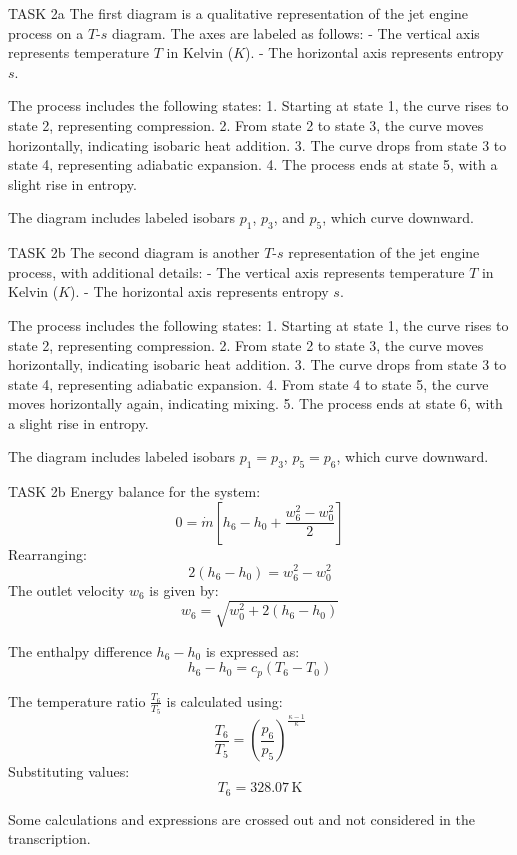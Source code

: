 TASK 2a  
The first diagram is a qualitative representation of the jet engine process on a \( T \)-\( s \) diagram. The axes are labeled as follows:  
- The vertical axis represents temperature \( T \) in Kelvin (\( K \)).  
- The horizontal axis represents entropy \( s \).  

The process includes the following states:  
1. Starting at state 1, the curve rises to state 2, representing compression.  
2. From state 2 to state 3, the curve moves horizontally, indicating isobaric heat addition.  
3. The curve drops from state 3 to state 4, representing adiabatic expansion.  
4. The process ends at state 5, with a slight rise in entropy.  

The diagram includes labeled isobars \( p_1 \), \( p_3 \), and \( p_5 \), which curve downward.  

TASK 2b  
The second diagram is another \( T \)-\( s \) representation of the jet engine process, with additional details:  
- The vertical axis represents temperature \( T \) in Kelvin (\( K \)).  
- The horizontal axis represents entropy \( s \).  

The process includes the following states:  
1. Starting at state 1, the curve rises to state 2, representing compression.  
2. From state 2 to state 3, the curve moves horizontally, indicating isobaric heat addition.  
3. The curve drops from state 3 to state 4, representing adiabatic expansion.  
4. From state 4 to state 5, the curve moves horizontally again, indicating mixing.  
5. The process ends at state 6, with a slight rise in entropy.  

The diagram includes labeled isobars \( p_1 = p_3 \), \( p_5 = p_6 \), which curve downward.  

TASK 2b  
Energy balance for the system:  
\[
0 = \dot{m} \left[ h_6 - h_0 + \frac{w_6^2 - w_0^2}{2} \right]
\]  
Rearranging:  
\[
2(h_6 - h_0) = w_6^2 - w_0^2
\]  
The outlet velocity \( w_6 \) is given by:  
\[
w_6 = \sqrt{w_0^2 + 2(h_6 - h_0)}
\]  

The enthalpy difference \( h_6 - h_0 \) is expressed as:  
\[
h_6 - h_0 = c_p (T_6 - T_0)
\]  

The temperature ratio \( \frac{T_6}{T_5} \) is calculated using:  
\[
\frac{T_6}{T_5} = \left( \frac{p_6}{p_5} \right)^{\frac{\kappa - 1}{\kappa}}
\]  
Substituting values:  
\[
T_6 = 328.07 \, \text{K}
\]  

Some calculations and expressions are crossed out and not considered in the transcription.